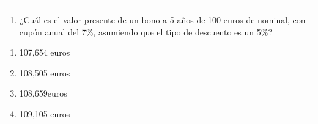 \documentclass[
  letterpaper,
  DIV=11,
  numbers=noendperiod]{scrreprt}
\providecommand{\tightlist}{%
  \setlength{\itemsep}{0pt}\setlength{\parskip}{0pt}}\usepackage{longtable,booktabs,array}
\begin{document}
\begin{center}\rule{0.5\linewidth}{0.5pt}\end{center}

\begin{enumerate}
\def\labelenumi{\arabic{enumi}.}
\setcounter{enumi}{88}
\tightlist
\item
  ¿Cuál es el valor presente de un bono a 5 años de 100 euros de
  nominal, con cupón anual del 7\%, asumiendo que el tipo de descuento
  es un 5\%?
\end{enumerate}

\begin{enumerate}
\def\labelenumi{\alph{enumi})}
\item
  107,654 euros
\item
  108,505 euros
\item
  108,659euros
\item
  109,105 euros
\end{enumerate}
\end{document}
